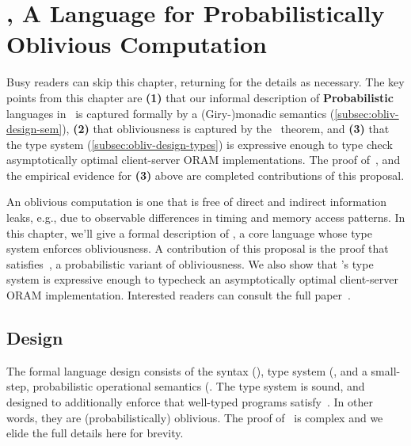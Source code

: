 \chapter{\obliv, A Language for Probabilistically Oblivious Computation}
\label{ch:obliv}

 

Busy readers can skip this chapter, returning for the details as necessary. The key points from this chapter are \textbf{(1)}
that our informal description of \textbf{Probabilistic} languages in~ is captured formally by a (Giry-)monadic semantics
(\ref{subsec:obliv-design-sem}), \textbf{(2)} that obliviousness is captured by the~ theorem, and \textbf{(3)} that
the type system (\ref{subsec:obliv-design-types}) is expressive enough to type check asymptotically optimal client-server ORAM implementations.
The proof of~, and the empirical evidence for \textbf{(3)} above are completed contributions of this proposal.

An oblivious computation is one that is free of direct and indirect information leaks, e.g., due to observable differences
in timing and memory access patterns. In this chapter, we'll give a formal description of \obliv, a core language whose
type system enforces obliviousness. A contribution of this proposal is the proof that \obliv satisfies~,
a probabilistic variant of obliviousness. We also show that \obliv's type system is expressive enough to typecheck an asymptotically
optimal client-server ORAM implementation. Interested readers can consult the full paper~\cite{}.

\section{Design}
\label{sec:obliv-design}

The formal language design consists of the syntax (), type system (,
and a small-step, probabilistic operational semantics (. The type system is sound, and designed to additionally
enforce that well-typed programs satisfy~. In other words, they are (probabilistically) oblivious.
The proof of~ is complex and we elide the full details here for brevity.


